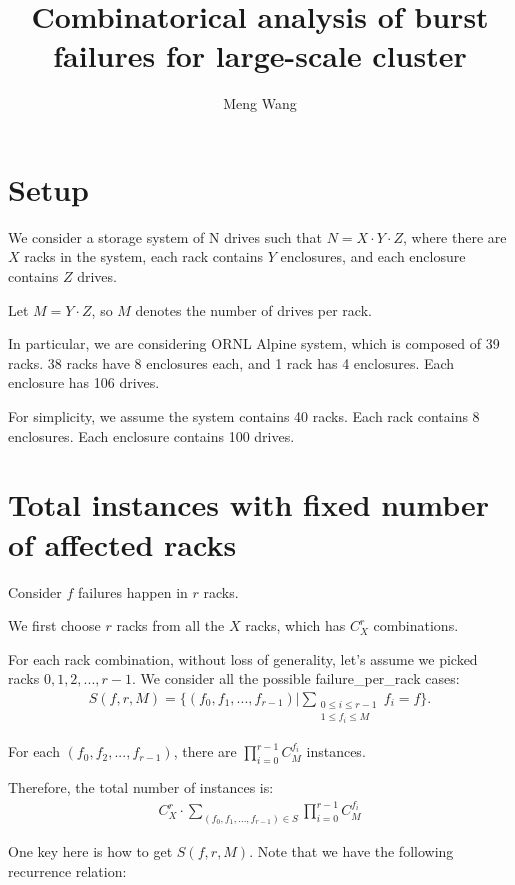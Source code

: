 \documentclass{article}
\title{Combinatorical analysis of burst failures for large-scale cluster}
\author{Meng Wang}
\begin{document}
\maketitle

\section{Setup}
We consider a storage system of N drives such that $N = X \cdot Y \cdot Z$, where there are $X$ racks in the system, each rack contains $Y$ enclosures, and each enclosure contains $Z$ drives.

Let $M = Y \cdot Z$, so $M$ denotes the number of drives per rack.

In particular, we are considering ORNL Alpine system, which is composed of 39 racks. 38 racks have 8 enclosures each, and 1 rack has 4 enclosures. Each enclosure has 106 drives.

For simplicity, we assume the system contains 40 racks. Each rack contains 8 enclosures. Each enclosure contains 100 drives.

\section{Total instances with fixed number of affected racks}

Consider $f$ failures happen in $r$ racks.

We first choose $r$ racks from all the $X$ racks, which has $C_{X}^{r}$ combinations.

For each rack combination, without loss of generality, let's assume we picked racks $0, 1, 2, ..., r-1$.
We consider all the possible failure\_per\_rack cases:
\begin{eqnarray}
S(f,r,M) = \{(f_0, f_1, ..., f_{r-1}) | \sum_{\substack{0 \leq i \leq r-1 \\ 1 \leq f_i \leq M}}f_i=f\}.
\end{eqnarray}


For each $(f_0, f_2, ..., f_{r-1})$, there are $\prod_{i=0}^{r-1}C_{M}^{f_i}$ instances.

Therefore, the total number of instances is:
\begin{eqnarray}
  C_{X}^{r} \cdot \sum_{(f_0, f_1, ..., f_{r-1}) \in S} \prod_{i=0}^{r-1}C_{M}^{f_i}
\label{eq:tcf}
\end{eqnarray}

One key here is how to get $S(f,r,M)$. Note that we have the following recurrence relation:
\end{document}
